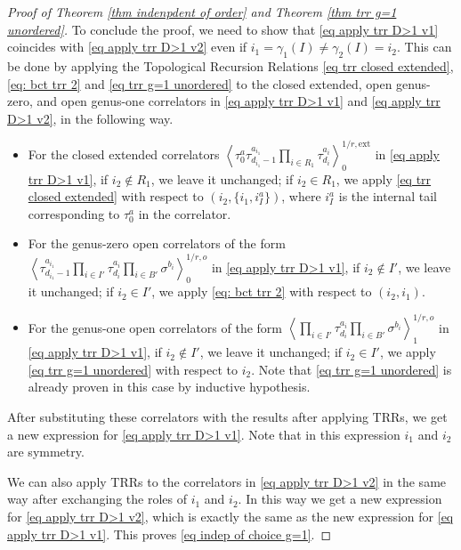 \documentclass[11pt]{amsart}
\theoremstyle{definition}
\theoremstyle{remark}
\newcommand{\<}{\left<}
\renewcommand{\>}{\right>}
\numberwithin{equation}{section}
\begin{document}
\begin{proof}[Proof of Theorem \ref{thm indenpdent of order} and Theorem \ref{thm trr g=1 unordered}]
    To conclude the proof, we need to show that \eqref{eq apply trr D>1 v1} coincides with \eqref{eq apply trr D>1 v2} even if $i_1=\gamma_1(I)\ne \gamma_2(I) = i_2$. This can be done by applying the Topological Recursion Relations \eqref{eq trr closed extended}, \eqref{eq: bct trr 2} and \eqref{eq trr g=1 unordered} to the closed extended, open genus-zero, and open genus-one correlators in  \eqref{eq apply trr D>1 v1} and \eqref{eq apply trr D>1 v2}, in the following way. 
    \begin{itemize}
        \item[-] For the closed extended correlators $\left\langle \tau_0^{a}\tau_{d_{i_1}-1}^{a_{i_1}}\prod_{i \in R_1}\tau_{d_i}^{a_i}\right\rangle^{1/r,\text{ext}}_0$ in \eqref{eq apply trr D>1 v1}, if $i_2\notin R_1$, we leave it unchanged; if $i_2\in R_1$, we apply \eqref{eq trr closed extended} with respect to $(i_2,\{i_1,i_I^a\})$, where $i_I^a$ is the internal tail corresponding to $\tau_0^a$ in the correlator.
        \item[-] For the genus-zero open correlators of the form $\left\langle \tau_{d_{i_1}-1}^{a_{i_1}}\prod_{i \in I'}\tau_{d_i}^{a_i} \prod_{i\in B'}\sigma^{b_i}\right\rangle^{1/r,o}_0$ in \eqref{eq apply trr D>1 v1}, if $i_2\notin I'$, we leave it unchanged; if $i_2\in I'$, we apply \eqref{eq: bct trr 2} with respect to $(i_2,i_1)$.
        \item[-] For the genus-one open correlators of the form $\left\langle \prod_{i \in I'}\tau_{d_i}^{a_i} \prod_{i\in B'}\sigma^{b_i}\right\rangle^{1/r,o}_1$ in \eqref{eq apply trr D>1 v1}, if $i_2\notin I'$, we leave it unchanged; if $i_2\in I'$, we apply \eqref{eq trr g=1 unordered} with respect to $i_2$. Note that \eqref{eq trr g=1 unordered} is already proven in this case by inductive hypothesis. 
    \end{itemize}

    After substituting these correlators with the results after applying TRRs, we get a new expression for \eqref{eq apply trr D>1 v1}. Note that in this expression $i_1$ and $i_2$ are symmetry.

    We can also apply TRRs to the correlators in \eqref{eq apply trr D>1 v2} in the same way after exchanging the roles of $i_1$ and $i_2$. In this way we get a new expression for \eqref{eq apply trr D>1 v2}, which is exactly the same as the new expression for \eqref{eq apply trr D>1 v1}. This proves \eqref{eq indep of choice g=1}.

    
\end{proof}
\end{document}
